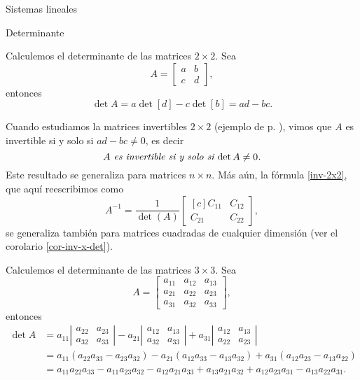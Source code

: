 \begin{chapter}{Sistemas lineales}
\begin{section}{Determinante}
    \begin{obs*} Calculemos el determinante de las matrices $2 \times 2$. Sea 
        $$A=\begin{bmatrix}a&b\\c&d\end{bmatrix},$$  entonces
        $$
        \det A = a \det [d] - c \det [b] = ad-bc.
        $$
        
       Cuando estudiamos la matrices invertibles $2\times 2$ (ejemplo de p. \pageref{inv-2x2-0}), vimos que $A$ es invertible si y solo si $ ad-bc \not=0$,  es decir 
        \begin{equation}
        \text{\textit{$A$ es invertible si y solo si $ \det A \not=0$.}}
        \end{equation}
        Este resultado se generaliza para matrices $n \times n$. Más aún, la fórmula \eqref{inv-2x2},  que aquí reescribimos como
        \begin{equation*}
            A^{-1} = \dfrac{1}{\det(A)}
            \begin{bmatrix*}[c]C_{11}&C_{12}\\C_{21}&C_{22}\end{bmatrix*},
        \end{equation*} se generaliza también para matrices cuadradas de cualquier dimensión (ver el corolario \ref{cor-inv-x-det}).
    \end{obs*}
    
    
    \begin{observacion*}  Calculemos el determinante de las matrices $3 \times 3$. Sea 
        $$A=\begin{bmatrix}a_{11}&a_{12}&a_{13}\\a_{21}&a_{22}&a_{23}\\a_{31}&a_{32}&a_{33}\end{bmatrix},$$  entonces
        \begin{align*}
        \det A &= a_{11}\left|\begin{matrix}a_{22}&a_{23}\\a_{32}&a_{33}\end{matrix}\right|
        - a_{21}\left|\begin{matrix}a_{12}&a_{13}\\a_{32}&a_{33}\end{matrix}\right|
        + a_{31}\left|\begin{matrix}a_{12}&a_{13}\\a_{22}&a_{23}\end{matrix}\right|\\
        &= a_{11}(a_{22}a_{33}- a_{23}a_{32})
        - a_{21}(a_{12}a_{33}-a_{13}a_{32}) 
        + a_{31}(a_{12}a_{23} - a_{13}a_{22}) \\
        &=a_{11}a_{22}a_{33}- a_{11}a_{23}a_{32} 
        - a_{12}a_{21}a_{33}+ a_{13}a_{21}a_{32}+ a_{12}a_{23}a_{31}
        - a_{13}a_{22}a_{31}.	
        \end{align*}
        

\end{observacion*}
\end{section}
\end{chapter}

